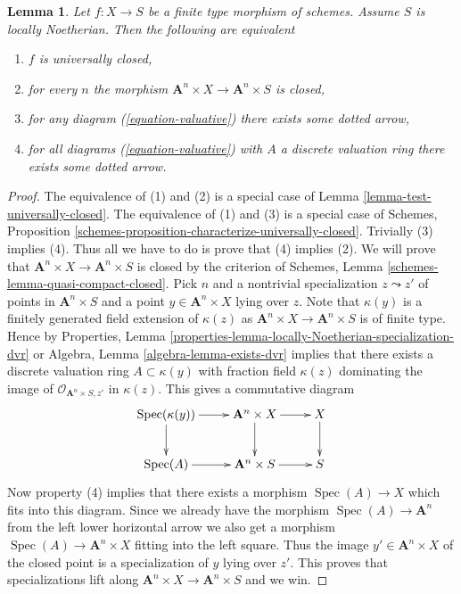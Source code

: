 \documentclass{stacks-project}
\theoremstyle{plain}
\newtheorem{lemma}[subsection]{Lemma}
\theoremstyle{definition}
\theoremstyle{remark}
\numberwithin{equation}{subsection}
\def\Spec{\mathop{\mathrm{Spec}}}
\begin{document}
\begin{lemma}
\label{lemma-check-universally-closed-Noetherian}
Let $f : X \to S$ be a finite type morphism of schemes.
Assume $S$ is locally Noetherian. Then the following are equivalent
\begin{enumerate}
\item $f$ is universally closed,
\item for every $n$ the morphism
$\mathbf{A}^n \times X \to \mathbf{A}^n \times S$ is closed,
\item for any diagram (\ref{equation-valuative}) there exists some
dotted arrow,
\item for all diagrams (\ref{equation-valuative}) with $A$ a discrete
valuation ring there exists some dotted arrow.
\end{enumerate}
\end{lemma}

\begin{proof}
The equivalence of (1) and (2) is a special case of
Lemma \ref{lemma-test-universally-closed}.
The equivalence of (1) and (3) is a special case of
Schemes, Proposition \ref{schemes-proposition-characterize-universally-closed}.
Trivially (3) implies (4).
Thus all we have to do is prove that (4) implies (2).
We will prove that $\mathbf{A}^n \times X \to \mathbf{A}^n \times S$
is closed by the criterion of
Schemes, Lemma \ref{schemes-lemma-quasi-compact-closed}.
Pick $n$ and a nontrivial specialization $z \leadsto z'$ of points
in $\mathbf{A}^n \times S$ and a point $y \in \mathbf{A}^n \times X$
lying over $z$. Note that $\kappa(y)$ is a finitely generated field
extension of $\kappa(z)$ as $\mathbf{A}^n \times X \to \mathbf{A}^n \times S$
is of finite type. Hence by
Properties, Lemma \ref{properties-lemma-locally-Noetherian-specialization-dvr}
or
Algebra, Lemma \ref{algebra-lemma-exists-dvr}
implies that there exists a discrete valuation ring $A \subset \kappa(y)$
with fraction field $\kappa(z)$ dominating the image of
$\mathcal{O}_{\mathbf{A}^n \times S, z'}$ in $\kappa(z)$.
This gives a commutative diagram
$$
\xymatrix{
\Spec(\kappa(y)) \ar[r] \ar[d] &
\mathbf{A}^n \times X \ar[d] \ar[r] & X \ar[d] \\
\Spec(A) \ar[r] & \mathbf{A}^n \times S \ar[r] & S
}
$$
Now property (4) implies that there exists a morphism
$\Spec(A) \to X$ which fits into this diagram.
Since we already have the morphism $\Spec(A) \to \mathbf{A}^n$
from the left lower horizontal arrow we also get a morphism
$\Spec(A) \to \mathbf{A}^n \times X$ fitting into the
left square. Thus the image $y' \in \mathbf{A}^n \times X$
of the closed point is a specialization of $y$ lying over $z'$.
This proves that specializations lift along
$\mathbf{A}^n \times X \to \mathbf{A}^n \times S$
and we win.
\end{proof}
\end{document}
